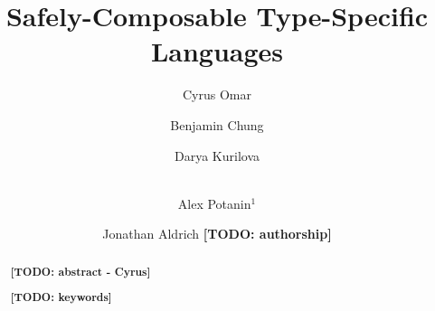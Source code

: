 \documentclass[runningheads,a4paper]{llncs}
\newcommand{\keywords}[1]{\par\addvspace\baselineskip
\noindent\keywordname\enspace\ignorespaces#1}
\newcommand{\todo}[1]{\textbf{[TODO: #1]}}
\begin{document}
\title{Safely-Composable Type-Specific Languages}

\author{Cyrus Omar \and Benjamin Chung \and Darya Kurilova \and\\
Alex Potanin$^{1}$ \and Jonathan Aldrich \todo{authorship}}

\maketitle


\begin{abstract}
\todo{abstract - Cyrus}
%
\keywords{\todo{keywords}}
\end{abstract}












\end{document}

